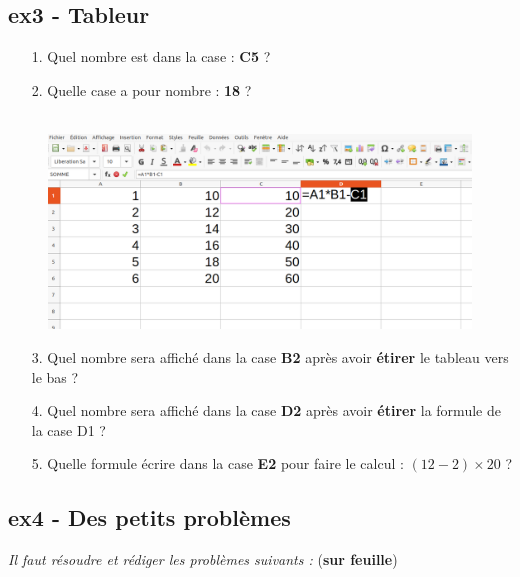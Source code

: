 \documentclass[11pt]{article}
\begin{document}
\begin{minipage}[t]{0.45\textwidth}
  \subsection*{ex3 - Tableur}

  \begin{enumerate}
    \item[1.] Quel nombre est dans la case : \textbf{C5} ? \dotfill
    \item[2.] Quelle case a pour nombre : \textbf{18} ? \dotfill
  \end{enumerate}

\end{minipage}
\begin{minipage}[t]{0.5\textwidth}

  \begin{figure}[H]
        \centering
        \includegraphics[width=\linewidth]{4x2-proportionnalite/ie-tableur.png}
  \end{figure}

\end{minipage}

\begin{enumerate}
\item[3.] Quel nombre sera affiché dans la case \textbf{B2} après avoir \textbf{étirer} le tableau vers le bas ? \dotfill
\item[4.] Quel nombre sera affiché dans la case \textbf{D2} après avoir \textbf{étirer} la formule de la case D1 ? \dotfill
\item[5.] Quelle formule écrire dans la case \textbf{E2} pour faire le calcul : $(12-2) \times 20$ ? \dotfill
\end{enumerate}



\newpage
\subsection*{ex4 - Des petits problèmes}
\textit{Il faut résoudre et rédiger les problèmes suivants :} (\textbf{sur feuille})
\end{document}
